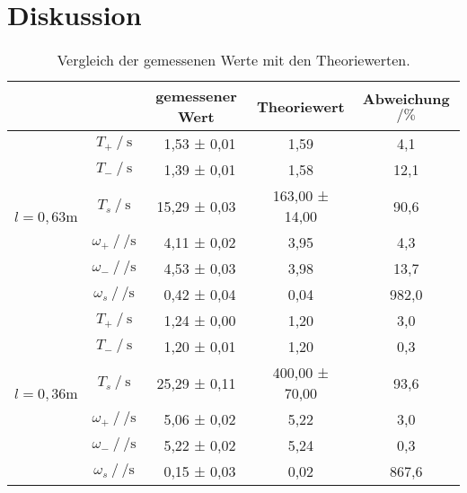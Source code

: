 \section{Diskussion}
\label{sec:Diskussion}

\begin{table}[H]
    \centering
    \caption{Vergleich der gemessenen Werte mit den Theoriewerten.}
    \label{tab:Vergleich}
    \begin{tabular}{c c c c S}
      \toprule
      &&{gemessener Wert}&{Theoriewert}&{Abweichung $\mathbin{/} \si{\percent}$}\\
      \midrule
        &{$T_+ \mathbin{/} \si{\second}$} & \, 1,53 ± 0,01 & 1,59 & 4,1 \\
        &{$T_- \mathbin{/} \si{\second}$} & \, 1,39 ± 0,01 & 1,58 & 12,1 \\
        &{$T_s \mathbin{/} \si{\second}$} & 15,29 ± 0,03 & 163,00 ± 14,00 & 90,6\\ 
        &{$\omega_+ \mathbin{/} \si{\per\second}$} & \, 4,11 ± 0,02 & 3,95 & 4,3\\
        &{$\omega_- \mathbin{/} \si{\per\second}$} & \, 4,53 ± 0,03 & 3,98 & 13,7\\
        &{$\omega_s \mathbin{/} \si{\per\second}$} & \, 0,42 ± 0,04 & 0,04 & 982,0\\
        \midrule
        &{$T_+ \mathbin{/} \si{\second}$} & \, 1,24 ± 0,00 & 1,20 & 3,0\\
        &{$T_- \mathbin{/} \si{\second}$} & \, 1,20 ± 0,01 & 1,20 & 0,3\\
        &{$T_s \mathbin{/} \si{\second}$} & 25,29 ± 0,11 & 400,00 ± 70,00 & 93,6\\ 
        &{$\omega_+ \mathbin{/} \si{\per\second}$} & \, 5,06 ± 0,02 & 5,22 & 3,0\\
        &{$\omega_- \mathbin{/} \si{\per\second}$} & \, 5,22 ± 0,02 & 5,24 & 0,3 \\
        &{$\omega_s \mathbin{/} \si{\per\second}$} & \, 0,15 ± 0,03 & 0,02 & 867,6\\
      \bottomrule
    \end{tabular}
  \end{table}



